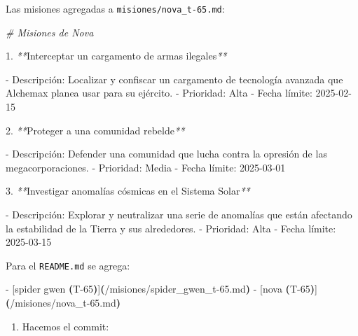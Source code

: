 \documentclass[
]{book}
\newenvironment{Shaded}{\begin{snugshade}}{\end{snugshade}}
\newcommand{\CommentTok}[1]{\textcolor[rgb]{0.56,0.35,0.01}{\textit{#1}}}
\newcommand{\ErrorTok}[1]{\textcolor[rgb]{0.64,0.00,0.00}{\textbf{#1}}}
\newcommand{\ExtensionTok}[1]{#1}
\newcommand{\KeywordTok}[1]{\textcolor[rgb]{0.13,0.29,0.53}{\textbf{#1}}}
\newcommand{\NormalTok}[1]{#1}
\newcommand{\PreprocessorTok}[1]{\textcolor[rgb]{0.56,0.35,0.01}{\textit{#1}}}
\providecommand{\tightlist}{%
  \setlength{\itemsep}{0pt}\setlength{\parskip}{0pt}}
\begin{document}
Las misiones agregadas a \texttt{misiones/nova\_t-65.md}:

\begin{Shaded}
\begin{Highlighting}[]
\CommentTok{\# Misiones de Nova}

\ExtensionTok{1.} \PreprocessorTok{**}\NormalTok{Interceptar un cargamento de armas ilegales}\PreprocessorTok{**}

   \ExtensionTok{{-}}\NormalTok{ Descripción: Localizar y confiscar un cargamento de tecnología avanzada que Alchemax planea usar para su ejército.}
   \ExtensionTok{{-}}\NormalTok{ Prioridad: Alta}
   \ExtensionTok{{-}}\NormalTok{ Fecha límite: 2025{-}02{-}15}

\ExtensionTok{2.} \PreprocessorTok{**}\NormalTok{Proteger a una comunidad rebelde}\PreprocessorTok{**}

   \ExtensionTok{{-}}\NormalTok{ Descripción: Defender una comunidad que lucha contra la opresión de las megacorporaciones.}
   \ExtensionTok{{-}}\NormalTok{ Prioridad: Media}
   \ExtensionTok{{-}}\NormalTok{ Fecha límite: 2025{-}03{-}01}

\ExtensionTok{3.} \PreprocessorTok{**}\NormalTok{Investigar anomalías cósmicas en el Sistema Solar}\PreprocessorTok{**}

   \ExtensionTok{{-}}\NormalTok{ Descripción: Explorar y neutralizar una serie de anomalías que están afectando la estabilidad de la Tierra y sus alrededores.}
   \ExtensionTok{{-}}\NormalTok{ Prioridad: Alta}
   \ExtensionTok{{-}}\NormalTok{ Fecha límite: 2025{-}03{-}15}
\end{Highlighting}
\end{Shaded}

Para el \texttt{README.md} se agrega:

\begin{Shaded}
\begin{Highlighting}[]
  \ExtensionTok{{-}}\NormalTok{ [spider gwen }\ErrorTok{(}\ExtensionTok{T{-}65}\KeywordTok{)}\ExtensionTok{]}\ErrorTok{(}\ExtensionTok{/misiones/spider\_gwen\_t{-}65.md}\KeywordTok{)}
  \ExtensionTok{{-}}\NormalTok{ [nova }\ErrorTok{(}\ExtensionTok{T{-}65}\KeywordTok{)}\ExtensionTok{]}\ErrorTok{(}\ExtensionTok{/misiones/nova\_t{-}65.md}\KeywordTok{)}
\end{Highlighting}
\end{Shaded}

\begin{enumerate}
\def\labelenumi{\arabic{enumi}.}
\setcounter{enumi}{2}
\tightlist
\item
  Hacemos el commit:
\end{enumerate}
\end{document}

